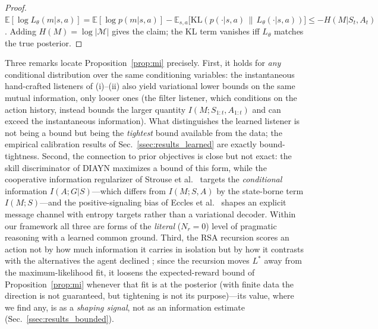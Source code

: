 \documentclass{article}
\newcommand{\Ltheta}{L_\theta}
\begin{document}
\begin{proof}
$\mathbb{E}[\log \Ltheta(m|s,a)] = \mathbb{E}[\log p(m|s,a)] - \mathbb{E}_{s,a}\big[\mathrm{KL}(p(\cdot|s,a)\,\|\,\Ltheta(\cdot|s,a))\big] \leq -H(M|S_t,A_t)$. Adding $H(M) = \log|\mathcal{M}|$ gives the claim; the KL term vanishes iff $\Ltheta$ matches the true posterior.
\end{proof}

Three remarks locate Proposition~\ref{prop:mi} precisely. First, it holds for \emph{any} conditional distribution over the same conditioning variables: the instantaneous hand-crafted listeners of (i)--(ii) also yield variational lower bounds on the same mutual information, only looser ones (the filter listener, which conditions on the action history, instead bounds the larger quantity $I(M; S_{1:t}, A_{1:t})$ and can exceed the instantaneous information). What distinguishes the learned listener is not being a bound but being the \emph{tightest} bound available from the data; the empirical calibration results of Sec.~\ref{ssec:results_learned} are exactly bound-tightness. Second, the connection to prior objectives is close but not exact: the skill discriminator of DIAYN \cite{eysenbach2019diversity} maximizes a bound of this form, while the cooperative information regularizer of Strouse et al.~\cite{strouse2018learning} targets the \emph{conditional} information $I(A;G|S)$---which differs from $I(M;S,A)$ by the state-borne term $I(M;S)$---and the positive-signaling bias of Eccles et al.~\cite{eccles2019biases} shapes an explicit message channel with entropy targets rather than a variational decoder. Within our framework all three are forms of the \emph{literal} ($N_r=0$) level of pragmatic reasoning with a learned common ground. Third, the RSA recursion scores an action not by how much information it carries in isolation but by how it contrasts with the alternatives the agent declined \cite{goodman2016pragmatic,zaslavsky2021rate}; since the recursion moves $L^*$ away from the maximum-likelihood fit, it loosens the expected-reward bound of Proposition~\ref{prop:mi} whenever that fit is at the posterior (with finite data the direction is not guaranteed, but tightening is not its purpose)---its value, where we find any, is as a \emph{shaping signal}, not as an information estimate (Sec.~\ref{ssec:results_bounded}).
\end{document}

